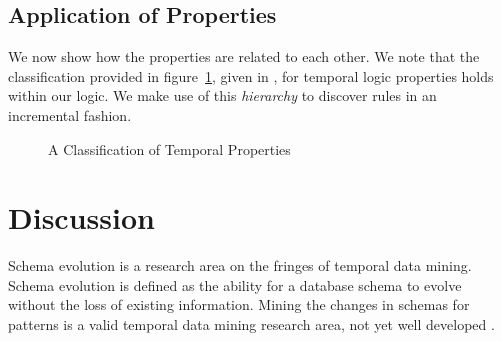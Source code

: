 \subsection{Application of Properties}

We now show how the properties are related to each other. We note that
the classification provided in figure~\ref{fig:Classification}, given
in \cite{mp92}, for temporal logic properties holds within our logic. We make use of this {\em hierarchy} to discover rules in
an incremental fashion.

\begin{figure}[ht]
\centerline{}
\caption{\label{fig:Classification} A Classification of Temporal
Properties}
\end{figure}

\section{Discussion}\label{sec:tl_disc}

Schema evolution \cite{rod94} is a research area on the fringes of
temporal data mining. Schema evolution is defined as the ability for a
database schema to evolve without the loss of existing
information. Mining the changes in schemas for patterns is a valid
temporal data mining research area, not yet well developed \cite{hk98}.
